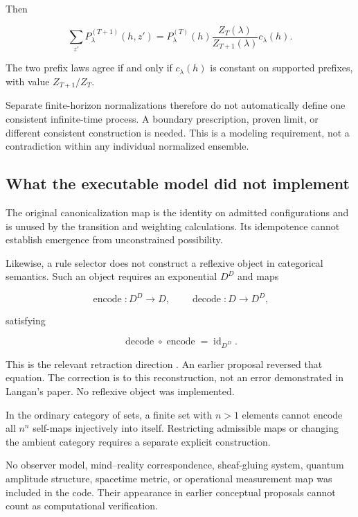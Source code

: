 \documentclass[11pt]{article}
\theoremstyle{remark}
\begin{document}
Then

\begin{equation}
\sum_{z'}P_\lambda^{(T+1)}(h,z')
=
P_\lambda^{(T)}(h)
\frac{Z_T(\lambda)}{Z_{T+1}(\lambda)}
c_\lambda(h).
\end{equation}

The two prefix laws agree if and only if \(c_\lambda(h)\) is constant on supported prefixes, with value \(Z_{T+1}/Z_T\).

Separate finite-horizon normalizations therefore do not automatically define one consistent infinite-time process. A boundary prescription, proven limit, or different consistent construction is needed. This is a modeling requirement, not a contradiction within any individual normalized ensemble.

\subsection{What the executable model did not implement}

The original canonicalization map is the identity on admitted configurations and is unused by the transition and weighting calculations. Its idempotence cannot establish emergence from unconstrained possibility.

Likewise, a rule selector does not construct a reflexive object in categorical semantics. Such an object requires an exponential \(D^D\) and maps

\begin{equation}
\operatorname{encode}:D^D\to D,
\qquad
\operatorname{decode}:D\to D^D,
\end{equation}

satisfying

\begin{equation}
\operatorname{decode}\circ\operatorname{encode}
=
\operatorname{id}_{D^D}.
\end{equation}

This is the relevant retraction direction \cite{vanderleer2025}. An earlier proposal reversed that equation. The correction is to this reconstruction, not an error demonstrated in Langan's paper. No reflexive object was implemented.

In the ordinary category of sets, a finite set with \(n>1\) elements cannot encode all \(n^n\) self-maps injectively into itself. Restricting admissible maps or changing the ambient category requires a separate explicit construction.

No observer model, mind--reality correspondence, sheaf-gluing system, quantum amplitude structure, spacetime metric, or operational measurement map was included in the code. Their appearance in earlier conceptual proposals cannot count as computational verification.
\end{document}
